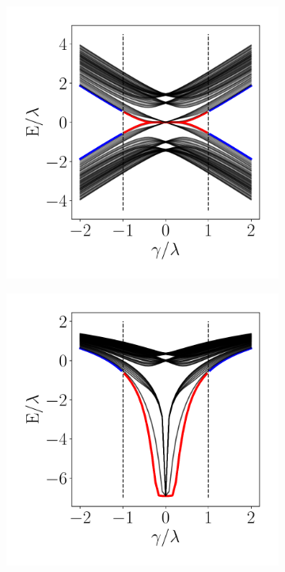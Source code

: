 \begin{figure}[h!]
     \centering
    \captionsetup[sub]{font=small}
     \begin{minipage}[h!]{0.9\textwidth}
         \begin{subfigure}[b!]{0.3 \textwidth}
             \caption{}
             \includegraphics[width=\textwidth]{Imagenes/Resultados_Hoti_Fractal/bands_square_shh_0.05.pdf}
             \label{}
         \end{subfigure}\hspace*{-0.5em}
         \begin{subfigure}[b!]{0.3 \textwidth}
             \caption{}
             \includegraphics[width=\textwidth]{Imagenes/Resultados_Hoti_Fractal/bands_square_shh_log0.05.pdf}

\end{subfigure}
\end{minipage}
\end{figure}
